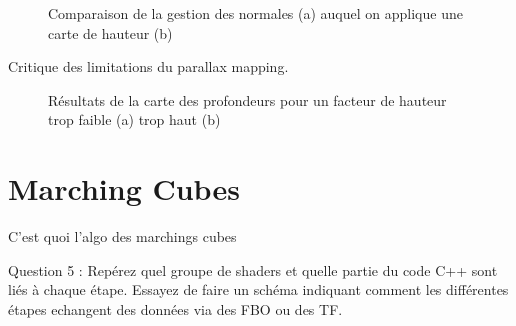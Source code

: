 \documentclass[a4paper]{article}
\begin{document}
\begin{figure}[H]
\centering
{}
\caption{Comparaison de la gestion des normales (a) auquel on applique une carte de hauteur (b)}
\end{figure}


Critique des limitations du parallax mapping.
\begin{figure}[H]
\centering
{}
\caption{Résultats de la carte des profondeurs pour un facteur de hauteur trop faible (a) trop haut (b)}
\end{figure}


\section{Marching Cubes}
C'est quoi l'algo des marchings cubes

Question 5 : Repérez quel groupe de shaders et quelle partie du code C++ sont liés à chaque étape. Essayez de faire un
schéma indiquant comment les différentes étapes echangent des données via des FBO ou des TF.
\end{document}
